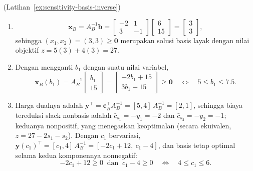 \begin{solution}(Latihan~\ref{ex:sensitivity-basis-inverse})
\begin{enumerate}
\item
\[
\mathbf{x}_B = A_B^{-1}\mathbf{b} = \begin{bmatrix} -2 & 1 \\ 3 & -1 \end{bmatrix}\begin{bmatrix} 6 \\ 15 \end{bmatrix} = \begin{bmatrix} 3 \\ 3 \end{bmatrix},
\]
sehingga $(x_1, x_2) = (3, 3) \geq \mathbf{0}$ merupakan solusi basis layak dengan nilai objektif $z = 5(3) + 4(3) = 27$.
\item Dengan mengganti $b_1$ dengan suatu nilai variabel,
\[
\mathbf{x}_B(b_1) = A_B^{-1}\begin{bmatrix} b_1 \\ 15 \end{bmatrix} = \begin{bmatrix} -2b_1 + 15 \\ 3b_1 - 15 \end{bmatrix} \geq \mathbf{0}
\quad\Longleftrightarrow\quad 5 \leq b_1 \leq 7.5.
\]
\item Harga dualnya adalah $\mathbf{y}^\top = \mathbf{c}_B^\top A_B^{-1} = [5, 4]\, A_B^{-1} = [2, 1]$, sehingga biaya tereduksi slack nonbasis adalah $\bar{c}_{s_1} = -y_1 = -2$ dan $\bar{c}_{s_2} = -y_2 = -1$; keduanya nonpositif, yang menegaskan keoptimalan (secara ekuivalen, $z = 27 - 2s_1 - s_2$). Dengan $c_1$ bervariasi, $\mathbf{y}(c_1)^\top = [c_1, 4]\, A_B^{-1} = [-2c_1 + 12,\ c_1 - 4]$, dan basis tetap optimal selama kedua komponennya nonnegatif:
\[
-2c_1 + 12 \geq 0 \ \text{ dan } \ c_1 - 4 \geq 0
\quad\Longleftrightarrow\quad 4 \leq c_1 \leq 6.
\]
\end{enumerate}
\end{solution}

